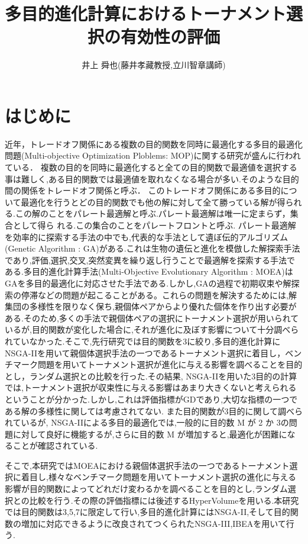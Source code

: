 \documentclass[a4paper,10pt]{jarticle}
\title{\large{多目的進化計算におけるトーナメント選択の有効性の評価}}
\author{井上 舜也(藤井孝藏教授,立川智章講師)}
\date{\vspace{-18mm}}
\begin{document}
\maketitle
\thispagestyle{empty}
\section{はじめに}
\vspace{-2mm}
近年，トレードオフ関係にある複数の目的関数を同時に最適化する多目的最適化問題(Multi-objective Optimization Ploblems: MOP)に関する研究が盛んに行われている\cite{Li2009}．
複数の目的を同時に最適化すると全ての目的関数で最適値を選択する事は難しく,ある目的関数では最適値を取れなくなる場合が多い.そのような目的間の関係をトレードオフ関係と呼ぶ．
このトレードオフ関係にある多目的について最適化を行うとどの目的関数でも他の解に対して全て勝っている解が得られる.この解のことをパレート最適解と呼ぶ.パレート最適解は唯一に定まらず，集合として得ら れる.この集合のことをパレートフロントと呼ぶ.
パレート最適解を効率的に探索する手法の中でも,代表的な手法として遺ぼ伝的アルゴリズム(Genetic Algorithm :  GA)がある.これは生物の遺伝と進化を模倣した解探索手法であり,評価,選択,交叉,突然変異を繰り返し行うことで最適解を探索する手法である.多目的進化計算手法(Multi-Objective Evolutionary Algorithm : MOEA)はGAを多目的最適化に対応させた手法である.しかし,GAの過程で初期収束や解探索の停滞などの問題が起こることがある。これらの問題を解決するためには,解集団の多様性を限りなく保ち,親個体ペアからより優れた個体を作り出す必要がある.そのため,多くの手法で親個体ペアの選択にトーナメント選択が用いられているが,目的関数が変化した場合に,それが進化に及ぼす影響について十分調べられていなかった.そこで,先行研究では目的関数を3に絞り,多目的進化計算にNSGA-IIを用いて親個体選択手法の一つであるトーナメント選択に着目し，ベンチマーク問題を用いてトーナメント選択が進化に与える影響を調べることを目的とし，ランダム選択との比較を行った.その結果, NSGA-IIを用いた3目的の計算では,トーナメント選択が収束性に与える影響はあまり大きくないと考えられるということが分かった.しかし,これは評価指標がGDであり,大切な指標の一つである解の多様性に関しては考慮されてない.
また目的関数が3目的に関して調べられているが, NSGA-IIによる多目的最適化では,一般的に目的数 M が 2 か 3の問題に対して良好に機能するが,さらに目的数 M が増加すると,最適化が困難になることが確認されている\cite{h.i}.

そこで,本研究ではMOEAにおける親個体選択手法の一つであるトーナメント選択に着目し,様々なベンチマーク問題を用いてトーナメント選択の進化に与える影響が目的関数によってどれだけ変わるかを調べることを目的とし,ランダム選択との比較を行う.その際の評価指標には後述するHyperVolumeを用いる.本研究では目的関数は3,5,7に限定して行い,多目的進化計算にはNSGA-II,そして目的関数の増加に対応できるように改良されてつくられたNSGA-III,IBEAを用いて行う.
\end{document}
